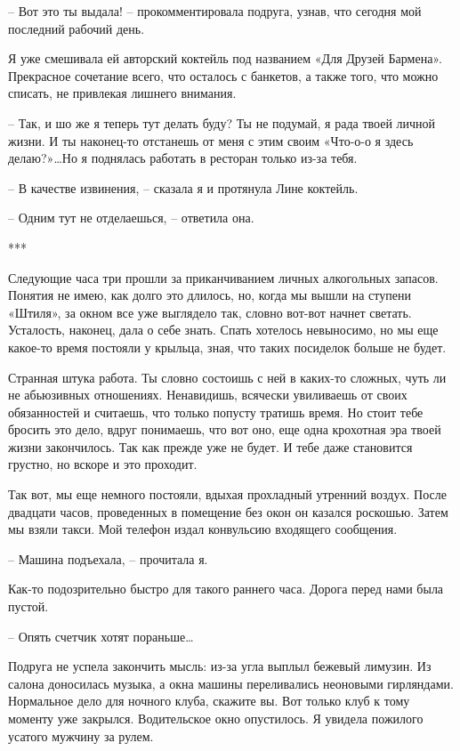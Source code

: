 \documentclass[
]{book}
\begin{document}
-- Вот это ты выдала! -- прокомментировала подруга, узнав, что сегодня мой последний рабочий день.

Я уже смешивала ей авторский коктейль под названием «Для Друзей Бармена». Прекрасное сочетание всего, что осталось с банкетов, а также того, что можно списать, не привлекая лишнего внимания.

-- Так, и шо же я теперь тут делать буду? Ты не подумай, я рада твоей личной жизни. И ты наконец-то отстанешь от меня с этим своим «Что-о-о я здесь делаю?»\ldots Но я поднялась работать в ресторан только из-за тебя.

-- В качестве извинения, -- сказала я и протянула Лине коктейль.

-- Одним тут не отделаешься, -- ответила она.

***

Следующие часа три прошли за приканчиванием личных алкогольных запасов. Понятия не имею, как долго это длилось, но, когда мы вышли на ступени «Штиля», за окном все уже выглядело так, словно вот-вот начнет светать. Усталость, наконец, дала о себе знать. Спать хотелось невыносимо, но мы еще какое-то время постояли у крыльца, зная, что таких посиделок больше не будет.

Странная штука работа. Ты словно состоишь с ней в каких-то сложных, чуть ли не абьюзивных отношениях. Ненавидишь, всячески увиливаешь от своих обязанностей и считаешь, что только попусту тратишь время. Но стоит тебе бросить это дело, вдруг понимаешь, что вот оно, еще одна крохотная эра твоей жизни закончилось. Так как прежде уже не будет. И тебе даже становится грустно, но вскоре и это проходит.

Так вот, мы еще немного постояли, вдыхая прохладный утренний воздух. После двадцати часов, проведенных в помещение без окон он казался роскошью. Затем мы взяли такси. Мой телефон издал конвульсию входящего сообщения.

-- Машина подъехала, -- прочитала я.

Как-то подозрительно быстро для такого раннего часа. Дорога перед нами была пустой.

-- Опять счетчик хотят пораньше\ldots{}

Подруга не успела закончить мысль: из-за угла выплыл бежевый лимузин. Из салона доносилась музыка, а окна машины переливались неоновыми гирляндами. Нормальное дело для ночного клуба, скажите вы. Вот только клуб к тому моменту уже закрылся. Водительское окно опустилось. Я увидела пожилого усатого мужчину за рулем.
\end{document}
